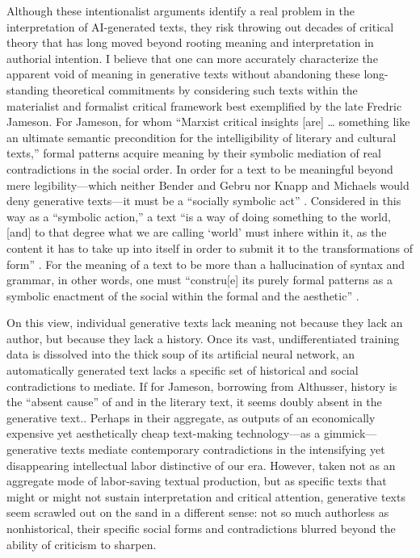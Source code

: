 \documentclass{simple-humanities}         %
\begin{document}
Although these intentionalist arguments identify a real problem in the interpretation of AI-generated texts, they risk throwing out decades of critical theory that has long moved beyond rooting meaning and interpretation in authorial intention.
I believe that one can more accurately characterize the apparent void of meaning in generative texts without abandoning these long-standing theoretical commitments by considering such texts within the materialist and formalist critical framework best exemplified by the late Fredric Jameson.
For Jameson, for whom ``Marxist critical insights [are] \ldots{} something like an ultimate semantic precondition for the intelligibility of literary and cultural texts,'' formal patterns acquire meaning by their symbolic mediation of real contradictions in the social order.
In order for a text to be meaningful beyond mere legibility---which neither Bender and Gebru nor Knapp and Michaels would deny generative texts---it must be a ``socially symbolic act'' \parencite[60, 125]{jamesonPoliticalUnconsciousNarrative2002}.
Considered in this way as a ``symbolic action,'' a text ``is a way of doing something to the world, [and] to that degree what we are calling `world' must inhere within it, as the content it has to take up into itself in order to submit it to the transformations of form'' \parencite[67]{jamesonPoliticalUnconsciousNarrative2002}.
For the meaning of a text to be more than a hallucination of syntax and grammar, in other words, one must ``constru[e] its purely formal patterns as a symbolic enactment of the social within the formal and the aesthetic'' \parencite[63]{jamesonPoliticalUnconsciousNarrative2002}.

On this view, individual generative texts lack meaning not because they lack an author, but because they lack a history.
Once its vast, undifferentiated training data is dissolved into the thick soup of its artificial neural network, an automatically generated text lacks a specific set of historical and social contradictions to mediate.
If for Jameson, borrowing from Althusser, history is the ``absent cause'' of and in the literary text, it seems doubly absent in the generative text.\parencite[20]{jamesonPoliticalUnconsciousNarrative2002}.
Perhaps in their aggregate, as outputs of an economically expensive yet aesthetically cheap text-making technology---as a gimmick---generative texts mediate contemporary contradictions in the intensifying yet disappearing intellectual labor distinctive of our era.
However, taken not as an aggregate mode of labor-saving textual production, but as specific texts that might or might not sustain interpretation and critical attention, generative texts seem scrawled out on the sand in a different sense: not so much authorless as nonhistorical, their specific social forms and contradictions blurred beyond the ability of criticism to sharpen.
\end{document}
